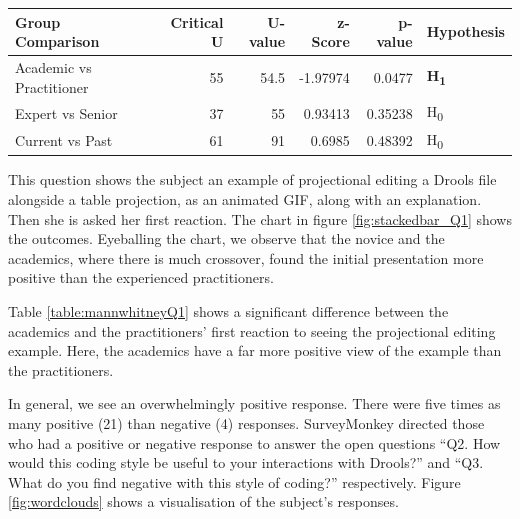 \noindent\begin{minipage}{\linewidth}
    \centering
    \label{fig:stackedbar_Q1}
    
    \begin{tabular}{ |l ||r |r |r | r|l | } 
        \hline
        Group Comparison                 & Critical U & U-value & z-Score  & p-value & Hypothesis         \\
        \hline
        \hline
        Academic vs Practitioner         & 55         & 54.5    & -1.97974 & 0.0477  & \textbf{H\textsubscript{1}}  \\ 
        \hline
        Expert vs Senior                 & 37         & 55      & 0.93413  & 0.35238 & H\textsubscript{0} \\ 
        \hline
        Current vs Past                  & 61         & 91      & 0.6985   & 0.48392 & H\textsubscript{0} \\ 
        \hline
    \end{tabular}
    \label{table:mannwhitneyQ1}
\end{minipage} 

This question shows the subject an example of projectional editing a Drools file alongside a table projection, as an animated GIF, along with an explanation.
Then she is asked her first reaction. 
The chart in figure \ref{fig:stackedbar_Q1} shows the outcomes.
Eyeballing the chart, we observe that the novice and the academics, where there is much crossover, found the initial presentation more positive than the experienced practitioners.

Table \ref{table:mannwhitneyQ1} shows a significant difference between the academics and the practitioners' first reaction to seeing the projectional editing example.
Here, the academics have a far more positive view of the example than the practitioners.

In general, we see an overwhelmingly positive response.
There were five times as many positive (21) than negative (4) responses.
SurveyMonkey directed those who had a positive or negative response to answer the open questions ``Q2. How would this coding style be useful to your interactions with Drools?'' and ``Q3. What do you find negative with this style of coding?'' respectively.
Figure \ref{fig:wordclouds} shows a visualisation of the subject's responses.

